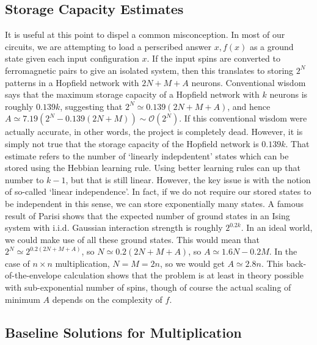 \documentclass{article}
\begin{document}
\subsection{Storage Capacity Estimates}
It is useful at this point to dispel a common misconception. In most of our circuits, we are attempting to load a perscribed answer $x, f(x)$ as a ground state given each input configuration $x$. If the input spins are converted to ferromagnetic pairs to give an isolated system, then this translates to storing $2^N$ patterns in a Hopfield network with $2N + M + A$ neurons. Conventional wisdom says that the maximum storage capacity of a Hopfield network with $k$ neurons is roughly $0.139k$, suggesting that $2^N \simeq 0.139(2N + M + A)$, and hence $A \simeq 7.19(2^N - 0.139(2N + M)) \sim \mathcal{O}(2^N)$. If this conventional wisdom were actually accurate, in other words, the project is completely dead. However, it is simply not true that the storage capacity of the Hopfield network is $0.139k$. That estimate refers to the number of `linearly indepdentent' states which can be stored using the Hebbian learning rule. Using better learning rules can up that number to $k-1$, but that is still linear. However, the key issue is with the notion of so-called `linear independence'. In fact, if we do not require our stored states to be independent in this sense, we can store exponentially many states. A famous result of Parisi shows that the expected number of ground states in an Ising system with i.i.d. Gaussian interaction strength is roughly $2^{0.2k}$. In an ideal world, we could make use of all these ground states. This would mean that $2^N \simeq 2^{0.2(2N + M + A)}$, so $N \simeq 0.2(2N + M + A)$, so $A \simeq 1.6N - 0.2M$. In the case of $n\times n$ multiplication, $N = M = 2n$, so we would get $A \simeq 2.8n$. This back-of-the-envelope calculation shows that the problem is at least in theory possible with sub-exponential number of spins, though of course the actual scaling of minimum $A$ depends on the complexity of $f$. 

\subsection{Baseline Solutions for Multiplication}
\end{document}
